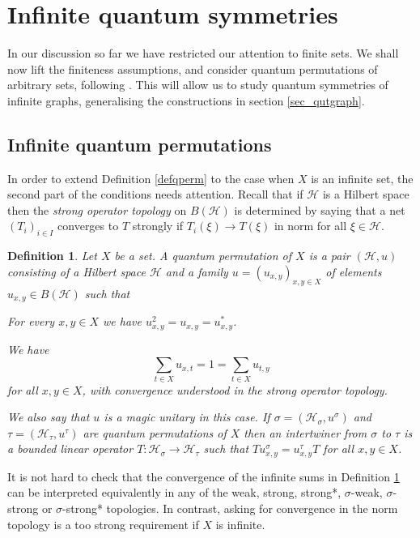 \documentclass[a4paper]{amsart}
\newcommand*{\Hc}{\mathcal{H}}
\newenvironment{bnum}
{\begin{list}{}
    {\setlength{\labelwidth}{15pt}
     \setlength{\leftmargin}{\labelwidth}
    }
}
{\end{list}}
\numberwithin{equation}{section}
\theoremstyle{change}
\newtheorem{definition}[theorem]{Definition}
\begin{document}
\section{Infinite quantum symmetries} \label{sec_infinite}

In our discussion so far we have restricted our attention to finite sets. We shall now  lift the finiteness assumptions, and consider quantum permutations of arbitrary sets, following \cite{VOIGT_infinitequantumpermutations}. This will allow us to study quantum symmetries of infinite graphs, generalising the constructions in section \ref{sec_qutgraph}.  


\subsection{Infinite quantum permutations} 

In order to extend Definition \ref{defqperm} to the case when $ X $ is an infinite set, the second part of the conditions needs attention. 
Recall that if $ \Hc $ is a Hilbert space then the \emph{strong operator topology} on $ B(\Hc) $ is determined by saying that a net $ (T_i)_{i \in I} $ converges to $ T $ strongly 
if $ T_i(\xi) \rightarrow T(\xi) $ in norm for all $ \xi \in \Hc $. 

\begin{definition} \label{defquantumpermutation}
Let $ X $ be a set. A quantum permutation of $ X $ is a pair $ (\Hc, u) $ consisting of a Hilbert space $ \Hc $ 
and a family $ u = (u_{x,y})_{x,y \in X} $ of elements $ u_{x,y} \in B(\Hc) $ such that 
\begin{bnum} 
\item[$\bullet$] For every $ x, y \in X $ we have $ u_{x,y}^2 = u_{x,y} = u_{x,y}^* $. 
\item[$\bullet$] We have 
$$ 
\sum_{t \in X} u_{x,t} = 1 = \sum_{t \in X} u_{t,y} 
$$
for all $ x,y \in X $, with convergence understood in the strong operator topology. 
\end{bnum}
We also say that $ u $ is a magic unitary in this case. 
If $ \sigma = (\Hc_\sigma, u^\sigma) $ and $ \tau = (\Hc_\tau, u^\tau) $ are quantum permutations of $ X $ then an intertwiner from $ \sigma $ to $ \tau $ is a 
bounded linear operator $ T: \Hc_\sigma \rightarrow \Hc_\tau $ such that $ T u^\sigma_{x,y} = u^\tau_{x,y} T $ for all $ x, y \in X $. 
\end{definition} 

It is not hard to check that the convergence of the infinite sums in Definition \ref{defquantumpermutation} can be interpreted equivalently in any of 
the weak, strong, strong*, $ \sigma $-weak, $ \sigma $-strong or $ \sigma $-strong* topologies. In contrast, asking for convergence in the norm topology is a too strong requirement if $ X $ is infinite. 
\end{document}
